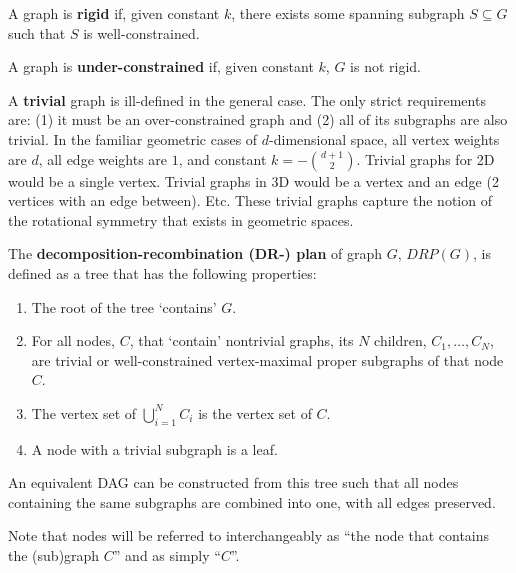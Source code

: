 \begin{definition}
    A graph is \textbf{rigid} if, given constant $k$, there exists some spanning subgraph $S\subseteq G$ such that $S$ is well-constrained.
\end{definition}

\begin{definition}
    A graph is \textbf{under-constrained} if, given constant $k$, $G$ is not rigid.
\end{definition}

\begin{definition}
    A \textbf{trivial} graph is ill-defined in the general case. The only strict requirements are: (1) it must be an over-constrained graph and (2) all of its subgraphs are also trivial.
    In the familiar geometric cases of $d$-dimensional space, all vertex weights are $d$, all edge weights are $1$, and constant $k= -{{d+1}\choose{2}}$. Trivial graphs for 2D would be a single vertex. Trivial graphs in 3D would be a vertex and an edge (2 vertices with an edge between). Etc. These trivial graphs capture the notion of the rotational symmetry that exists in geometric spaces.
\end{definition}

\begin{definition}
    The \textbf{decomposition-recombination (DR-) plan} of graph $G$, $DRP(G)$, is defined as a tree that has the following properties:
    \begin{enumerate}
        \item The root of the tree `contains' $G$.
        \item For all nodes, $C$, that `contain' nontrivial graphs, its $N$ children, $C_1, \ldots, C_N$, are trivial or well-constrained vertex-maximal proper subgraphs of that node $C$.
        \item The vertex set of $\bigcup_{i=1}^N{C_i}$ is the vertex set of $C$.
        \item A node with a trivial subgraph is a leaf.
    \end{enumerate}


    An equivalent DAG can be constructed from this tree such that all nodes containing the same subgraphs are combined into one, with all edges preserved.

    Note that nodes will be referred to interchangeably as ``the node that contains the (sub)graph $C$'' and as simply ``$C$''.
\end{definition}

